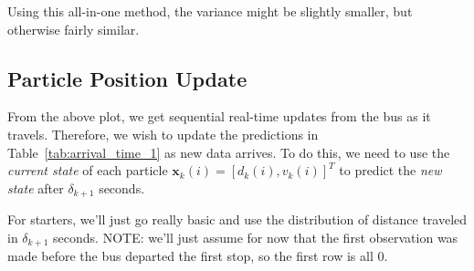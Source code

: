 \documentclass[11pt]{article}\usepackage[]{graphicx}\usepackage[]{color}
\newcommand{\bx}{\boldsymbol{x}}
\begin{document}
Using this all-in-one method, the variance might be slightly smaller,
but otherwise fairly similar.




\subsection{Particle Position Update}
\label{sec:particle_likelihood}

From the above plot, we get sequential real-time updates from the bus as it travels.
Therefore, we wish to update the predictions in Table~\ref{tab:arrival_time_1} as new data arrives.
To do this, we need to use the \emph{current state} of each particle 
$\bx_k(i) = \left[d_k(i), v_k(i)\right]^T$
to predict the \emph{new state} after $\delta_{k+1}$ seconds.


For starters, we'll just go really basic and use the distribution of distance traveled in $\delta_{k+1}$ seconds.
NOTE: we'll just assume for now that the first observation was made before the bus departed
the first stop, so the first row is all 0.
\end{document}
